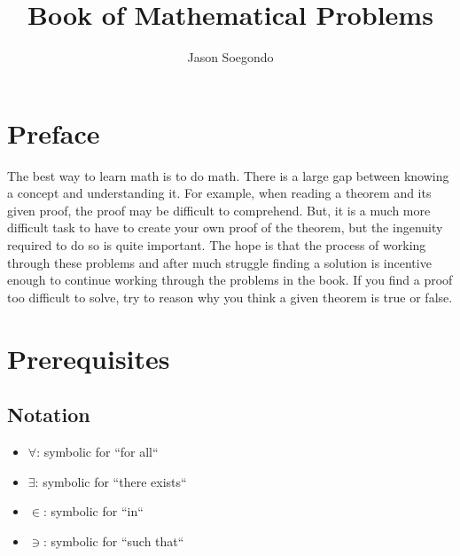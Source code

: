 \documentclass[a4paper,12pt]{article}
\title{\textbf{Book of Mathematical Problems}}
\author{Jason Soegondo}
\begin{document}
\maketitle
\newpage
\tableofcontents
\newpage

\section{Preface}

\hspace{\parindent}The best way to learn math is to do math. There is a large gap between knowing a concept and understanding it. For example, when reading a theorem and its given proof, the proof may be difficult to comprehend. But, it is a much more difficult task to have to create your own proof of the theorem, but the ingenuity required to do so is quite important. The hope is that the process of working through these problems and after much struggle finding a solution is incentive enough to continue working through the problems in the book. If you find a proof too difficult to solve, try to reason why you think a given theorem is true or false.\\

\newpage
\section{Prerequisites}

\newpage

\subsection{Notation}
\begin{itemize}
 \item $\forall$: symbolic for ``for all``
 \item $\exists$: symbolic for ``there exists``
 \item $\in$: symbolic for ``in``
 \item $\ni$: symbolic for ``such that``
\end{itemize}
\end{document}

